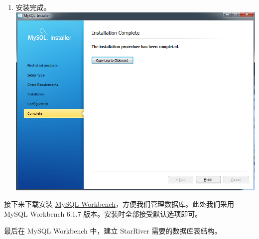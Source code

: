 \begin{enumerate}
\item
  安装完成。 \includegraphics{../img/mysql_11.png}
\end{enumerate}

接下来下载安装 \href{http://dev.mysql.com/downloads/workbench/}{MySQL
Workbench}，方便我们管理数据库。此处我们采用 MySQL Workbench 6.1.7
版本。安装时全部接受默认选项即可。

最后在 MySQL Workbench 中，建立 StarRiver 需要的数据库表结构。

